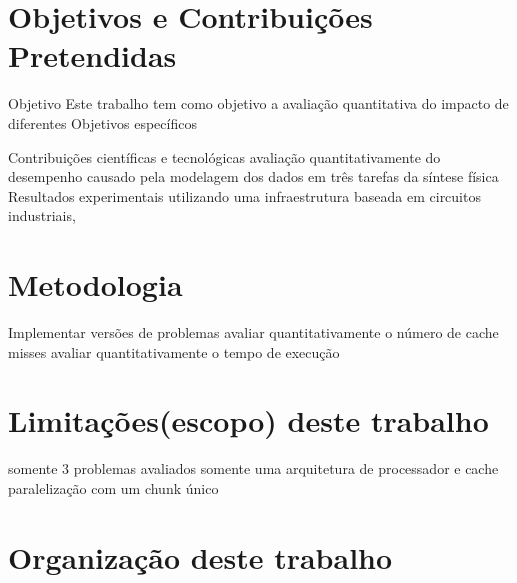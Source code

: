 \section{Objetivos e Contribuições Pretendidas}
        Objetivo
            Este trabalho tem como objetivo a avaliação quantitativa do impacto de diferentes
        Objetivos específicos

        Contribuições científicas e tecnológicas
            avaliação quantitativamente do desempenho causado pela modelagem dos dados em três tarefas da síntese física
            Resultados experimentais utilizando uma infraestrutura baseada em circuitos industriais,

\section{Metodologia}
        Implementar versões de problemas
        avaliar quantitativamente o número de cache misses
        avaliar quantitativamente o tempo de execução

\section{Limitações(escopo) deste trabalho}
        somente 3 problemas avaliados
        somente uma arquitetura de processador e cache
        paralelização com um chunk único

\section{Organização deste trabalho}
